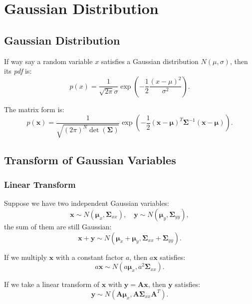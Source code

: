\chapter{Gaussian Distribution}
\label{cpt:app-A}
\section{Gaussian Distribution}
If way say a random variable $x$ satisfies a Gaussian distribution $N(\mu, \sigma)$, then its \textit{pdf} is:
\begin{equation}
p\left( x \right) = \frac{1}{{\sqrt {2\pi } \sigma }}\exp \left( { - \frac{1}{2}\frac{{{{\left( {x - \mu } \right)}^2}}}{{{\sigma ^2}}}} \right).
\end{equation}

The matrix form is:
\begin{equation}
p\left( \mathbf{x} \right) = \frac{1}{{\sqrt {(2\pi)^N  \det \left( \boldsymbol{\Sigma } \right) }}}\exp \left( { - \frac{1}{2}{{\left( {\mathbf{x} - \boldsymbol{\mu} } \right)}^T}{\boldsymbol{\Sigma} ^{ - 1}}\left( {\mathbf{x} - \boldsymbol{\mu} } \right)} \right).
\end{equation}

\section{Transform of Gaussian Variables}
\subsection{Linear Transform}
Suppose we have two independent Gaussian variables:
\[
\mathbf{x} \sim N( \boldsymbol{\mu}_x, \boldsymbol{\Sigma}_{xx} ), \quad \mathbf{y} \sim N( \boldsymbol{\mu}_y, \boldsymbol{\Sigma}_{yy} ),
\]
the sum of them are still Gaussian: 
\begin{equation}
\mathbf{x}+\mathbf{y} \sim N( \boldsymbol{\mu}_x + \boldsymbol{\mu}_y, \boldsymbol{\Sigma}_{xx} + \boldsymbol{\Sigma}_{yy}).
\end{equation}

If we multiply $\mathbf{x}$ with a constant factor $a$, then $a \mathbf{x}$ satisfies:
\begin{equation}
a\mathbf{x} \sim N( a \boldsymbol{\mu}_x, a^2 \boldsymbol{\Sigma}_{xx}).
\end{equation}

If we take a linear transform of $\mathbf{x}$ with $\mathbf{y} = \mathbf{A} \mathbf{x}$, then $\mathbf{y}$ satisfies:
\begin{equation}
\mathbf{y} \sim N( \mathbf{A} \boldsymbol{\mu}_x, \mathbf{A} \boldsymbol{\Sigma}_{xx} \mathbf{A}^T).
\end{equation}

